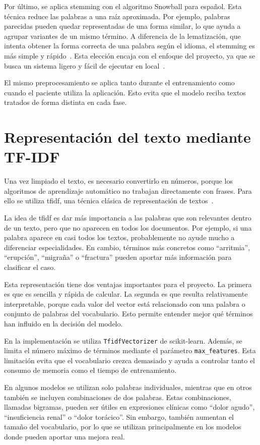 Por último, se aplica \gls{stemming} con el algoritmo Snowball para español. Esta técnica reduce las palabras a una raíz aproximada. Por ejemplo, palabras parecidas pueden quedar representadas de una forma similar, lo que ayuda a agrupar variantes de un mismo término. A diferencia de la lematización, que intenta obtener la forma correcta de una palabra según el idioma, el \gls{stemming} es más simple y rápido~\cite{ibm_stemming}. Esta elección encaja con el enfoque del proyecto, ya que se busca un sistema ligero y fácil de ejecutar en local~\cite{snowflake_pln}.

El mismo preprocesamiento se aplica tanto durante el entrenamiento como cuando el paciente utiliza la aplicación. Esto evita que el modelo reciba textos tratados de forma distinta en cada fase.

\section{Representación del texto mediante TF-IDF}

Una vez limpiado el texto, es necesario convertirlo en números, porque los algoritmos de aprendizaje automático no trabajan directamente con frases. Para ello se utiliza \gls{tfidf}, una técnica clásica de representación de textos~\cite{wikipedia_tfidf}.

La idea de \gls{tfidf} es dar más importancia a las palabras que son relevantes dentro de un texto, pero que no aparecen en todos los documentos. Por ejemplo, si una palabra aparece en casi todos los textos, probablemente no ayude mucho a diferenciar especialidades. En cambio, términos más concretos como ``arritmia'', ``erupción'', ``migraña'' o ``fractura'' pueden aportar más información para clasificar el caso.

Esta representación tiene dos ventajas importantes para el proyecto. La primera es que es sencilla y rápida de calcular. La segunda es que resulta relativamente interpretable, porque cada valor del vector está relacionado con una palabra o conjunto de palabras del vocabulario. Esto permite entender mejor qué términos han influido en la decisión del modelo.

En la implementación se utiliza \texttt{TfidfVectorizer} de scikit-learn. Además, se limita el número máximo de términos mediante el parámetro \texttt{max\_features}. Esta limitación evita que el vocabulario crezca demasiado y ayuda a controlar tanto el consumo de memoria como el tiempo de entrenamiento.

En algunos modelos se utilizan solo palabras individuales, mientras que en otros también se incluyen combinaciones de dos palabras. Estas combinaciones, llamadas bigramas, pueden ser útiles en expresiones clínicas como ``dolor agudo'', ``insuficiencia renal'' o ``dolor torácico''. Sin embargo, también aumentan el tamaño del vocabulario, por lo que se utilizan principalmente en los modelos donde pueden aportar una mejora real.

